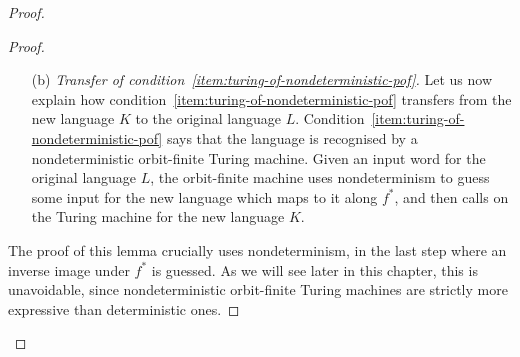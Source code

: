 \begin{proof}
\begin{proof}
\begin{itemize}
		\begin{claim}
					There is a function $g$, which is computable in the usual sense without atoms, and makes the following diagram commute:
		\[
		\begin{tikzcd}
		2^* 
		\ar[r,"g"]
		\ar[d,"\text{representation $r$ for $\Sigma$}"']
		&
		2^* 
		\ar[d,"\text{representation $r$ for $\Sigma$}"]
		\\
		\atoms^{d}
		\ar[r,"f"']
		& 
		\Sigma
		\end{tikzcd}
		\]
		\end{claim}
		\begin{proof}
			As in Definition~\ref{def:atom-representation-extended-to-pof-sets}, when representing elements of $\Sigma$ we think of it as being equal to a  subquotiented pof set. By inspecting the definition of the function $f$ from the proof of Claim~\ref{claim:surjective-from-tuples}, we see that it can be lifted to representations, as required in the proof of the current claim. The function $f$ begins by checking the orbit of a suffix of the input tuple, and then based on this orbit it gives the output component and the corresponding output atoms, which are selected from the input atoms. 
		\end{proof}

		Using the above claim, we show that the pulled back language $K$ satisfies condition~\ref{item:turing-of-some-rep}, i.e.~representations of words in this language are recognised by a Turing machine without atoms. 
		Given a representation of a word for $K$, a Turing machine can compute a representation of  its image under $f^*$, thanks to the above claim, and then use the Turing machine from assumption the original language. This shows the transfer of condition~\ref{item:turing-of-some-rep}.
		\item[(b)] 	\emph{Transfer of condition~\ref{item:turing-of-nondeterministic-pof}.}	Let us now explain how condition~\ref{item:turing-of-nondeterministic-pof} transfers from the new language $K$ to the original language $L$. Condition~\ref{item:turing-of-nondeterministic-pof} says that the language is recognised by a nondeterministic orbit-finite Turing machine. Given an input word for the original language $L$, the orbit-finite machine uses nondeterminism to guess some input for the new language which maps to it along $f^*$, and then calls on the Turing machine for the new language $K$.
		\end{itemize}
	The proof of this lemma crucially uses nondeterminism, in the last step where an inverse image under $f^*$ is guessed. As we will see later in this chapter, this is unavoidable, since nondeterministic orbit-finite Turing machines are strictly more expressive than deterministic ones. 
	\end{proof}




\end{proof}
